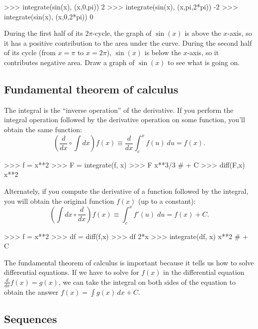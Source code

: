 \small
\begin{verbatimtab}
>>> integrate(sin(x), (x,0,pi))
2
>>> integrate(sin(x), (x,pi,2*pi))
-2
>>> integrate(sin(x), (x,0,2*pi))
0
\end{verbatimtab}
\normalsize

\noindent
During the first half of its $2\pi$-cycle,
the graph of $\sin(x)$ is above the $x$-axis, so it has a positive contribution to the area under the curve.
During the second half of its cycle (from $x=\pi$ to $x=2\pi$),
$\sin(x)$ is below the $x$-axis, so it contributes negative area.
Draw a graph of $\sin(x)$ to see what is going on. 

\subsection{Fundamental theorem of calculus}
\label{calculus:fundamental_theorem_of_calculus}

The integral is the ``inverse operation'' of the derivative.
If you perform the integral operation followed by the derivative operation on some function, 
you'll obtain the same function:
\[
  \left(\frac{d}{dx} \circ \int dx \right) f(x) \equiv \frac{d}{dx} \int_c^x f(u)\:du = f(x).
\]



\small
\begin{verbatimtab}
>>> f = x**2
>>> F = integrate(f, x)
>>> F
x**3/3           # + C
>>> diff(F,x)
x**2
\end{verbatimtab}
\normalsize

\noindent
Alternately, if you compute the derivative of a function followed by the integral,
you will obtain the original function $f(x)$ (up to a constant):
\[
  \left( \int dx \circ \frac{d}{dx}\right) f(x) \equiv \int_c^x f'(u)\;du = f(x) + C.
\]



\small
\begin{verbatimtab}
>>> f = x**2
>>> df = diff(f,x)
>>> df
2*x
>>> integrate(df, x)
x**2    # + C
\end{verbatimtab}
\normalsize

\noindent
The fundamental theorem of calculus is important because it tells us how to solve differential equations.
If we have to solve for $f(x)$ in the differential equation $\frac{d}{dx}f(x) = g(x)$,
we can take the integral on both sides of the equation to obtain the answer $f(x) = \int g(x)\,dx + C$.

\subsection{Sequences}
\label{calculus:sequences}

